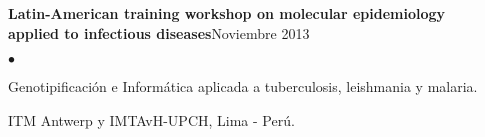 \documentclass[margin,line]{res}
\newenvironment{list2}{
	\begin{list}{$\bullet$}{%
			\setlength{\itemsep}{0in}
			\setlength{\parsep}{0in} \setlength{\parskip}{0in}
			\setlength{\topsep}{0in} \setlength{\partopsep}{0in}
			\setlength{\leftmargin}{0.2in}}}{\end{list}}
\begin{document}
\begin{resume}
		
		
		
		
		{\bf Latin-American training workshop on molecular epidemiology \\applied to infectious diseases}\hfill {Noviembre 2013}\\
		\vspace*{-.1in}%
		\begin{list2} %
			\item Genotipificación e Informática aplicada a tuberculosis, leishmania y malaria.
			\item ITM Antwerp y IMTAvH-UPCH, Lima - Perú.\\
		\end{list2}
		

\end{resume}
\end{document}
